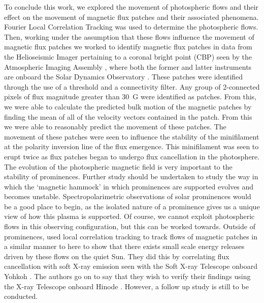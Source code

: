 To conclude this work, we explored the movement of photospheric flows and their effect on the movement of magnetic flux patches and their associated phenomena. Fourier Local Correlation Tracking \citep[FLCT; ][]{welsch_ilct_2004,fisher_flct_2008} was used to determine the photospheric flows. Then, working under the assumption that these flows influence the movement of magnetic flux patches \citep{muglach_photospheric_2021} we worked to identify magnetic flux patches in data from the Helioseismic Imager \citep[HMI; ][]{scherrer_helioseismic_2012} pertaining to a coronal bright point (CBP) seen by the Atmospheric Imaging Assembly \citep[AIA; ][]{lemen_atmospheric_2012}, where both the former and latter instruments are onboard the Solar Dynamics Observatory \citep[SDO; ][]{pesnell_solar_2012}. These patches were identified through the use of a threshold and a connectivity filter. Any group of 2-connected pixels of flux magnitude greater than 30~G were identified as patches. From this, we were able to calculate the predicted bulk motion of the magnetic patches by finding the mean of all of the velocity vectors contained in the patch. From this we were able to reasonably predict the movement of these patches. The movement of these patches were seen to influence the stability of the minifilament at the polarity inversion line of the flux emergence. This minifilament was seen to erupt twice as flux patches began to undergo flux cancellation in the photosphere. The evolution of the photospheric magnetic field is very important to the stability of prominences. Further study should be undertaken to study the way in which the `magnetic hammock' in which prominences are supported evolves and becomes unstable. Spectropolarimetric observations of solar prominences would be a good place to begin, as the isolated nature of a prominence gives us a unique view of how this plasma is supported. Of course, we cannot exploit photospheric flows in this observing configuration, but this can be worked towards. Outside of prominences, \cite{potts_small-scale_2007} used local correlation tracking to track flows of magnetic patches in a similar manner to here to show that there exists small scale energy releases driven by these flows on the quiet Sun. They did this by correlating flux cancellation with soft X-ray emission seen with the Soft X-ray Telescope \citep[SXT; ][]{tsuneta_soft_1991} onboard Yohkoh \citep{ogawara_solar-mission_1991}. The authors go on to say that they wish to verify their findings using the X-ray Telescope \citep[XRT; ][]{golub_x-ray_2007} onboard Hinode \citep{kosugi_hinode_2007}. However, a follow up study is still to be conducted.

